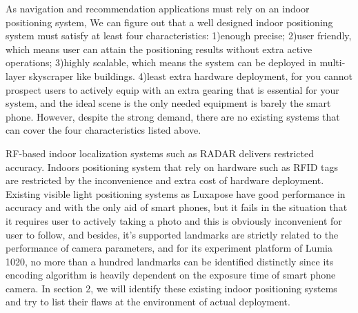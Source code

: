 \documentclass[conference]{IEEEtran}
\begin{document}
As navigation and recommendation applications must rely on an indoor positioning system, We can figure out that a well designed indoor positioning system must satisfy at least four characteristics: 1)enough precise; 2)user friendly, which means user can attain the positioning results without extra active operations; 3)highly scalable, which means the system can be deployed in multi-layer skyscraper like buildings. 4)least extra hardware deployment, for you cannot prospect users to actively equip with an extra gearing that is essential for your system, and the ideal scene is the only needed equipment is barely the smart phone. However, despite the strong demand, there are no existing systems that can cover the four characteristics listed above.

RF-based indoor localization systems such as RADAR delivers restricted accuracy. Indoors positioning system that rely on hardware such as RFID tags are restricted by the inconvenience and extra cost of hardware deployment. Existing visible light positioning systems as Luxapose have good performance in accuracy and with the only aid of smart phones, but it fails in the situation that it requires user to actively taking a photo and this is obviously inconvenient for user to follow, and besides, it's supported landmarks are strictly related to the performance of camera parameters, and for its experiment platform of Lumia 1020, no more than a hundred landmarks can be identified distinctly since its encoding algorithm is heavily dependent on the exposure time of smart phone camera. In section 2, we will identify these existing indoor positioning systems and try to list their flaws at the environment of actual deployment.
\end{document}

